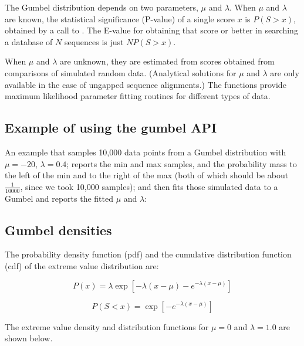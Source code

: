 The Gumbel distribution depends on two parameters, $\mu$ and
$\lambda$. When $\mu$ and $\lambda$ are known, the statistical
significance (P-value) of a single score $x$ is $P(S>x)$, obtained by
a call to .  The E-value for obtaining that
score or better in searching a database of $N$ sequences is just
$NP(S>x)$.

When $\mu$ and $\lambda$ are unknown, they are estimated from scores
obtained from comparisons of simulated random data. (Analytical
solutions for $\mu$ and $\lambda$ are only available in the case of
ungapped sequence alignments.)  The  functions
provide maximum likelihood parameter fitting routines for different
types of data. 

\subsection{Example of using the gumbel API}

An example that samples 10,000 data points from a Gumbel distribution
with $\mu=-20$, $\lambda=0.4$; reports the min and max samples, and
the probability mass to the left of the min and to the right of the
max (both of which should be about $\frac{1}{10000}$, since we took
10,000 samples); and then fits those simulated data to a Gumbel and
reports the fitted $\mu$ and $\lambda$:





\subsection{Gumbel densities}

The probability density function (pdf) and the cumulative distribution
function (cdf) of the extreme value distribution are:

\begin{equation}
P(x) = \lambda \exp \left[ -\lambda (x - \mu) - e^{- \lambda (x - \mu)} \right]
\label{eqn:gumbel_density}
\end{equation}

\begin{equation}
P(S < x) = \exp \left[ -e^{-\lambda(x - \mu)} \right]
\label{eqn:gumbel_distribution}
\end{equation}

The extreme value density and distribution functions for $\mu = 0$ and
$\lambda = 1.0$ are shown below.

